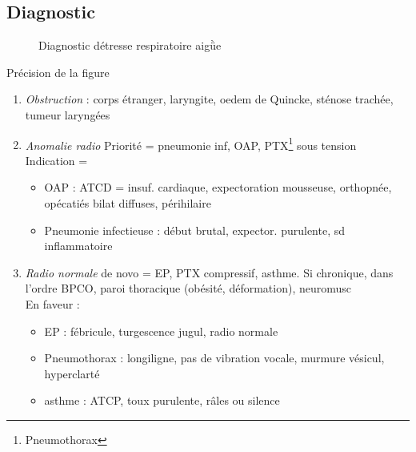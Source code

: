 \documentclass{article}
\begin{document}
\subsection{Diagnostic}

\begin{figure}[htpb]
  \centering
  \label{fig:diag_detresse_respi}
  \caption{Diagnostic détresse respiratoire aigǜe}
\end{figure}

Précision de la figure~
\begin{enumerate}
\item \textit{Obstruction}  : corps étranger, laryngite, oedem de Quincke, sténose
  trachée, tumeur laryngées
\item \textit{Anomalie radio} Priorité = pneumonie inf, OAP,
  PTX\footnote{Pneumothorax} sous
  tension\\
  Indication =
  \begin{itemize}
  \item OAP : {ATCD = insuf. cardiaque}, {expectoration mousseuse, orthopnée},
    {opécatiés bilat diffuses, périhilaire}
  \item Pneumonie infectieuse : {début brutal}, {expector. purulente}, {sd
      inflammatoire}
  \end{itemize}
\item \textit{Radio normale} de novo = EP, PTX compressif, asthme. Si
  chronique, dans l'ordre BPCO, paroi thoracique (obésité, déformation),
  neuromusc\\
  En faveur :
  \begin{itemize}
  \item EP : fébricule, turgescence jugul, radio normale
  \item Pneumothorax : {longiligne}, {pas de vibration vocale}, murmure vésicul,
    {hyperclarté}
  \item asthme : ATCP, {toux purulente}, {râles ou silence}
  \end{itemize}
\end{enumerate}
\end{document}
